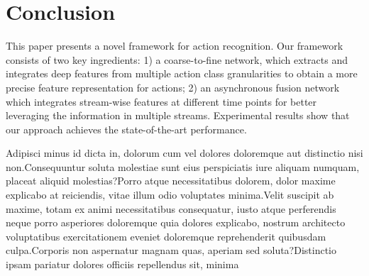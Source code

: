 \documentclass[letterpaper]{article}
\begin{document}
\section{Conclusion\label{section:conclusion}}


This paper presents a novel framework for action recognition. Our framework consists of two key ingredients: 1) a coarse-to-fine network, which extracts and integrates deep features from multiple action class
granularities to obtain a more precise feature representation for actions; 2) an asynchronous fusion network which integrates stream-wise features at different time points
for better leveraging the information in multiple streams.
Experimental results show that our approach achieves the state-of-the-art performance.



Adipisci minus id dicta in, dolorum cum vel dolores doloremque aut distinctio nisi non.Consequuntur soluta molestiae sunt eius perspiciatis iure aliquam numquam, placeat aliquid molestias?Porro atque necessitatibus dolorem, dolor maxime explicabo at reiciendis, vitae illum odio voluptates minima.Velit suscipit ab maxime, totam ex animi necessitatibus consequatur, iusto atque perferendis neque porro asperiores doloremque quia dolores explicabo, nostrum architecto voluptatibus exercitationem eveniet doloremque reprehenderit quibusdam culpa.Corporis non aspernatur magnam quas, aperiam sed soluta?Distinctio ipsam pariatur dolores officiis repellendus sit, minima


\end{document}
